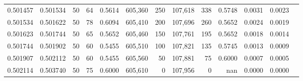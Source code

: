 \begin{tabular}{rrrrrrrrrrrrr}
0.501457 & 0.501534 &    50 &  64 &                                     0.5614 & 605,360 &     250 & 107,618 &     338 & 0.5748 & 0.0031 & 0.0023 \\
0.501534 & 0.501622 &    50 &  78 &                                     0.6094 & 605,410 &     200 & 107,696 &     260 & 0.5652 & 0.0024 & 0.0019 \\
0.501623 & 0.501744 &    50 &  65 &                                     0.5652 & 605,460 &     150 & 107,761 &     195 & 0.5652 & 0.0018 & 0.0014 \\
0.501744 & 0.501902 &    50 &  60 &                                     0.5455 & 605,510 &     100 & 107,821 &     135 & 0.5745 & 0.0013 & 0.0009 \\
0.501907 & 0.502112 &    50 &  60 &                                     0.5455 & 605,560 &      50 & 107,881 &      75 & 0.6000 & 0.0007 & 0.0005 \\
0.502114 & 0.503740 &    50 &  75 &                                     0.6000 & 605,610 &       0 & 107,956 &       0 &    nan & 0.0000 & 0.0000 \\
\bottomrule
\end{tabular}
